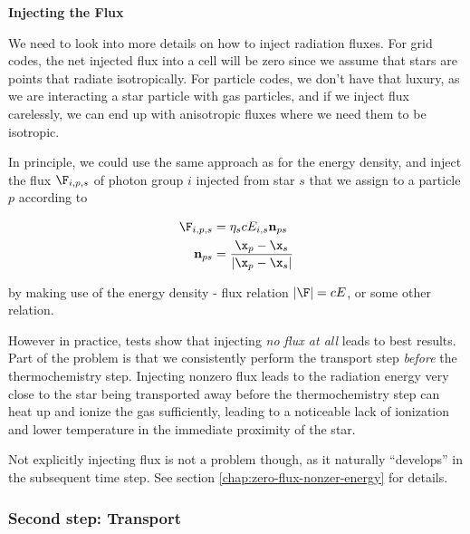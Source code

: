 \textbf{Injecting the Flux}

We need to look into more details on how to inject radiation fluxes. For grid codes, the net 
injected flux into a cell will be zero since we assume that stars are points that radiate 
isotropically. For particle codes, we don't have that luxury, as we are interacting a star 
particle with gas particles, and if we inject flux carelessly, we can end up with anisotropic fluxes 
where we need them to be isotropic. 

In principle, we could use the same approach as for the energy density, and inject the flux 
$\F_{i,p,s}$ of photon group $i$ injected from star $s$ that we assign to a particle $p$ according 
to

\begin{align}
	\F_{i,p,s} &= \eta_s c E_{i,s} \mathbf{n}_{ps}  \\
    \mathbf{n}_{ps} &=  \frac{\x_p - \x_s}{|\x_p - \x_s|} 
\end{align}

by making use of the energy density - flux relation $|\F| = c E$, or some other relation.

However in practice, tests show that injecting \emph{no flux at all} leads to best results. Part of 
the problem is that we consistently perform the transport step \emph{before} the thermochemistry 
step. Injecting nonzero flux leads to the radiation energy very close to the star being transported 
away before the thermochemistry step can heat up and ionize the gas sufficiently, leading to 
a noticeable lack of ionization and lower temperature in the immediate proximity of the star.

Not explicitly injecting flux is not a problem though, as it naturally ``develops'' in the 
subsequent time step. See section \ref{chap:zero-flux-nonzer-energy} for details.















\subsubsection{Second step: Transport}\label{chap:transport-step}

